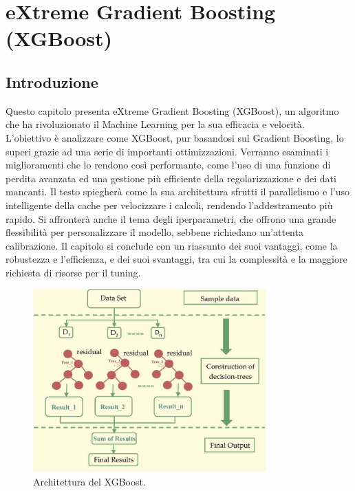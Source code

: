 \documentclass[a4paper,12pt]{report}
\begin{document}
	\chapter{eXtreme Gradient Boosting (XGBoost)}
	
	\section{Introduzione}
	Questo capitolo presenta eXtreme Gradient Boosting (XGBoost), un algoritmo che ha rivoluzionato il Machine Learning per la sua efficacia e velocità. L'obiettivo è analizzare come XGBoost, pur basandosi sul Gradient Boosting, lo superi grazie ad una serie di importanti ottimizzazioni. Verranno esaminati i miglioramenti che lo rendono così performante, come l'uso di una funzione di perdita avanzata ed una gestione più efficiente della regolarizzazione e dei dati mancanti. Il testo spiegherà come la sua architettura sfrutti il parallelismo e l'uso intelligente della cache per velocizzare i calcoli, rendendo l'addestramento più rapido. Si affronterà anche il tema degli iperparametri, che offrono una grande flessibilità per personalizzare il modello, sebbene richiedano un'attenta calibrazione. Il capitolo si conclude con un riassunto dei suoi vantaggi, come la robustezza e l'efficienza, e dei suoi svantaggi, tra cui la complessità e la maggiore richiesta di risorse per il tuning. \cite{chen2016xgboost, friedman2001gradientboosting, hoerl1970ridge, tibshirani1996lasso, zou2005elasticnet, fatima2023xgbvsrf}
	
	\begin{figure}[H]
		\centering
		\includegraphics[width=0.8\textwidth]{img/xgb.png}
		\caption{Architettura del XGBoost.}
	\end{figure}
	
\end{document}
